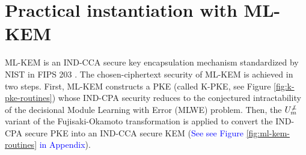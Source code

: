 \documentclass[journal=tches,submission]{iacrtrans}
\begin{document}
\section{Practical instantiation with ML-KEM}\label{sec:practical-instantiation-with-mlkem}



ML-KEM is an IND-CCA secure key encapsulation mechanism standardized by NIST in FIPS 203 \cite{FIPS203}. The chosen-ciphertext security of ML-KEM is achieved in two steps. First, ML-KEM constructs a PKE (called K-PKE, see Figure \ref{fig:k-pke-routines}) whose IND-CPA security reduces to the conjectured intractability of the decisional Module Learning with Error (MLWE) problem. Then, the $U^{\not\bot}_m$ variant of the Fujisaki-Okamoto transformation is applied to convert the IND-CPA secure PKE into an IND-CCA secure KEM (\textcolor{blue}{See see Figure \ref{fig:ml-kem-routines} in Appendix}).
\end{document}
